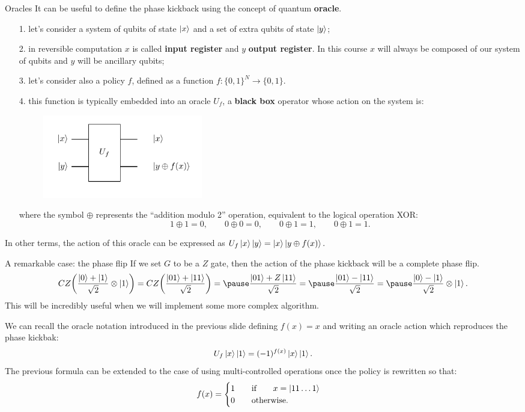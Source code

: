 \documentclass[aspectratio=169, 8pt, xcolor={svgnames}, hyperref={linkcolor=black}]{beamer}
\begin{document}
\begin{frame}{Oracles}
It can be useful to define the phase kickback using the concept of quantum \textbf{oracle}.

\begin{itemize}[noitemsep]
\item[1.] let's consider a system of qubits of state $\ket{x}$ and a set of extra qubits of state $\ket{y}$; \pause
\item[2.] in reversible computation $x$ is called \textbf{input register} and $y$ \textbf{output register}. In this 
course $x$ will always be composed of our system of qubits and $y$ will be ancillary qubits; \pause
\item[3.] let's consider also a policy $f$, defined as a function $f:\{0,1\}^{N}\to\{0,1\}$. \pause
\item[4.] this function is typically embedded into an 
oracle $U_f$, a \textbf{black box} operator whose action on the system is:
\begin{figure}
   \includegraphics[width=0.35\textwidth]{figures/oracle.pdf}
\end{figure}
where the symbol $\oplus$ represents the ``addition modulo 2'' operation, equivalent to 
the logical operation XOR: 
$$ 1\oplus1=0, \qquad 0\oplus0=0, \qquad 0\oplus1=1, \qquad 0\oplus1=1. $$
\pause
\end{itemize}
In other terms, the action of this oracle can be expressed as $U_f\ket{x}\ket{y}=\ket{x}\ket{y\oplus f(x)}.$
\end{frame}

\begin{frame}{A remarkable case: the phase flip}
If we set $G$ to be a $Z$ gate, then the action of the phase kickback will be 
a complete phase flip.
$$ CZ \biggl( \frac{\ket{0}+\ket{1}}{\sqrt{2}} \otimes \ket{1} \biggr)  = 
CZ \biggl( \frac{\ket{01}+\ket{11}}{\sqrt{2}} \biggr) = \pause
\frac{\ket{01}+Z\ket{11}}{\sqrt{2}} = \pause
\frac{\ket{01}- \ket{11}}{\sqrt{2}} = \pause
\frac{\ket{0}- \ket{1}}{\sqrt{2}} \otimes \ket{1}.
$$ 
This will be incredibly useful when we will implement some more complex algorithm. \pause

We can recall the oracle notation introduced in the previous slide defining $f(x)=x$
and writing an oracle 
action which reproduces the phase kickbak:
$$ U_f \ket{x} \ket{1} = (-1)^{f(x)}\ket{x}\ket{1}. $$
\pause
The previous formula can be extended to the case of using multi-controlled operations 
once the policy is rewritten so that:
$$ f(x) = \begin{cases}
1 \qquad \text{if} \qquad x=\ket{11\dots 1} \\
0 \qquad \text{otherwise}.
\end{cases} $$

\end{frame}
\end{document}
